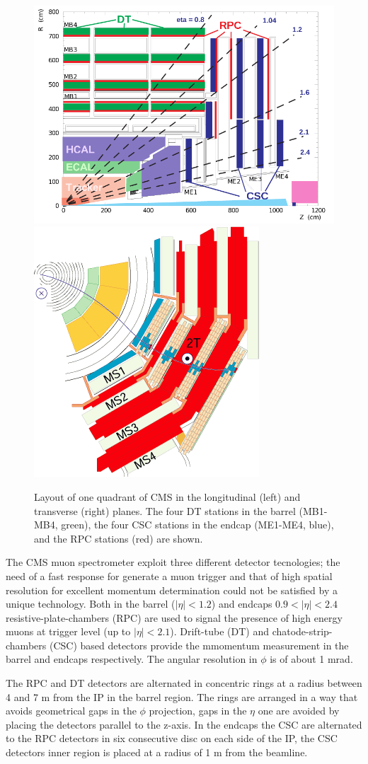 \begin{figure}
  \centering
  \includegraphics[width = .45\textwidth]{figures/cms/muon_layout.png}
  \includegraphics[width = .45\textwidth]{figures/cms/muons_xyview.png}
  \caption{Layout of one quadrant of CMS in the longitudinal (left) and transverse (right) planes.
    The four DT stations in the barrel (MB1-MB4, green),
    the four CSC stations in the endcap (ME1-ME4, blue), and the RPC stations (red) are shown.}
  \label{fig:cms_muon_layout}
\end{figure}

The CMS muon spectrometer exploit three different detector tecnologies; the need of a fast response for
generate a muon trigger and that of high spatial resolution for excellent momentum determination could not
be satisfied by a unique technology.
Both in the barrel ($|\eta| < 1.2$) and endcaps $0.9 < |\eta| < 2.4$ resistive-plate-chambers (RPC) are used
to signal the presence of high energy muons at trigger level (up to $|\eta| < 2.1$).
Drift-tube (DT) and chatode-strip-chambers (CSC) based detectors
provide the mmomentum measurement in the barrel and endcaps respectively. The angular resolution
in $\phi $ is of about 1 mrad.

The RPC and DT detectors are alternated in concentric rings at a radius between 4 and 7 m from the IP
in the barrel region. The rings are arranged in a way that avoids geometrical gaps in the $\phi $ projection, gaps
in the $\eta $ one are avoided by placing the detectors parallel to the z-axis.
In the endcaps the CSC are alternated to the RPC detectors in six consecutive disc on each side of the IP, the CSC
detectors inner region is placed at a radius of 1 m from the beamline.

